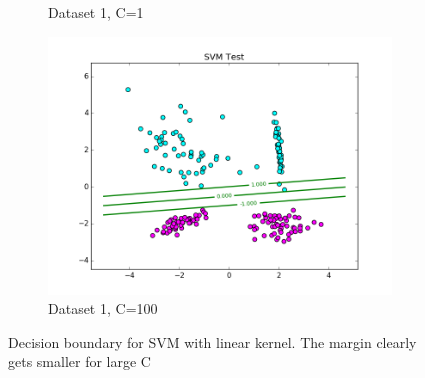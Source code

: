 \documentclass[10pt,twoside]{article}
\begin{document}
\begin{figure}[h]
\begin{subfigure}[b]{0.33\textwidth}
                \caption{Dataset 1, C=1}
        \end{subfigure}%
        \begin{subfigure}[b]{0.33\textwidth}
                \centering
                \includegraphics[width=\linewidth]{Figures/P2/svm_data1_test_C100.png}
                \caption{Dataset 1, C=100}
        \end{subfigure}%
        \caption{Decision boundary for SVM with linear kernel. The margin clearly gets smaller for large C}
\end{figure}
\end{document}
